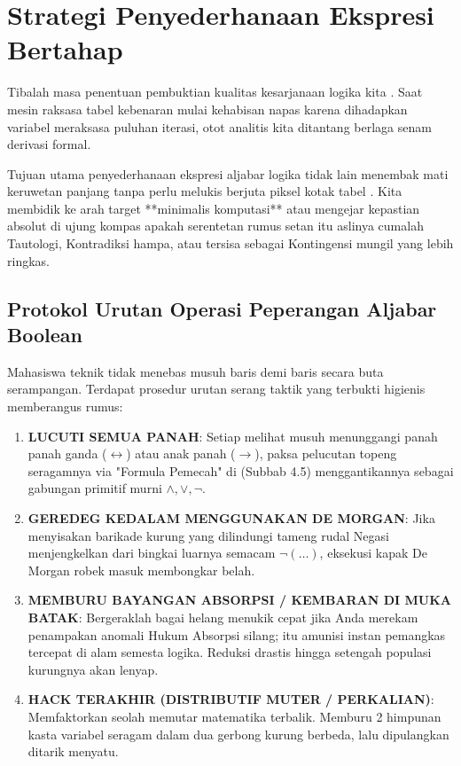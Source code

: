 \section{Strategi Penyederhanaan Ekspresi Bertahap}

Tibalah masa penentuan pembuktian kualitas kesarjanaan logika kita \cite{wiki_proplogic}. Saat mesin raksasa tabel kebenaran mulai kehabisan napas karena dihadapkan variabel meraksasa puluhan iterasi, otot analitis kita ditantang berlaga senam derivasi formal.

Tujuan utama penyederhanaan ekspresi aljabar logika tidak lain menembak mati keruwetan panjang tanpa perlu melukis berjuta piksel kotak tabel \cite{rosen2019}. Kita membidik ke arah target **minimalis komputasi** atau mengejar kepastian absolut di ujung kompas apakah serentetan rumus setan itu aslinya cumalah Tautologi, Kontradiksi hampa, atau tersisa sebagai Kontingensi mungil yang lebih ringkas.

\subsection{Protokol Urutan Operasi Peperangan Aljabar Boolean}

Mahasiswa teknik tidak menebas musuh baris demi baris secara buta serampangan. Terdapat prosedur urutan serang taktik yang terbukti higienis memberangus rumus:
\begin{enumerate}
    \item \textbf{LUCUTI SEMUA PANAH}: Setiap melihat musuh menunggangi panah panah ganda ($\leftrightarrow$) atau anak panah ($\rightarrow$), paksa pelucutan topeng seragamnya via "Formula Pemecah" di (Subbab 4.5) menggantikannya sebagai gabungan primitif murni $\wedge, \vee, \neg$.
    \item \textbf{GEREDEG KEDALAM MENGGUNAKAN DE MORGAN}: Jika menyisakan barikade kurung yang dilindungi tameng rudal Negasi menjengkelkan dari bingkai luarnya semacam $\neg(\dots)$, eksekusi kapak De Morgan robek masuk membongkar belah.
    \item \textbf{MEMBURU BAYANGAN ABSORPSI / KEMBARAN DI MUKA BATAK}: Bergeraklah bagai helang menukik cepat jika Anda merekam penampakan anomali Hukum Absorpsi silang; itu amunisi instan pemangkas tercepat di alam semesta logika. Reduksi drastis hingga setengah populasi kurungnya akan lenyap.
    \item \textbf{HACK TERAKHIR (DISTRIBUTIF MUTER / PERKALIAN)}: Memfaktorkan seolah memutar matematika terbalik. Memburu 2 himpunan kasta variabel seragam dalam dua gerbong kurung berbeda, lalu dipulangkan ditarik menyatu.
\end{enumerate}

